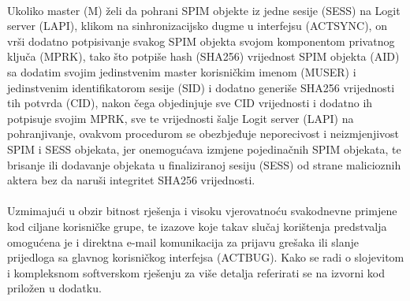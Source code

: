 \paragraph*{}
Ukoliko master (M) želi da pohrani SPIM objekte iz jedne sesije (SESS) na Logit server (LAPI), klikom na sinhronizacijsko dugme u interfejsu (ACTSYNC), on vrši dodatno potpisivanje svakog SPIM objekta svojom komponentom privatnog ključa (MPRK), tako što potpiše hash (SHA256) vrijednost SPIM objekta (AID) sa dodatim svojim jedinstvenim master korisničkim imenom (MUSER) i jedinstvenim identifikatorom sesije (SID) i dodatno generiše SHA256 vrijednosti tih potvrda (CID), nakon čega objedinjuje sve CID vrijednosti i dodatno ih potpisuje svojim MPRK, sve te vrijednosti šalje Logit server (LAPI) na pohranjivanje, ovakvom procedurom se obezbjeđuje neporecivost i neizmjenjivost SPIM i SESS objekata, jer onemogućava izmjene pojedinačnih SPIM objekata, te brisanje ili dodavanje objekata u finaliziranoj sesiju (SESS) od strane malicioznih aktera bez da naruši integritet SHA256 vrijednosti.

\paragraph*{}
Uzmimajući u obzir bitnost rješenja i visoku vjerovatnoću svakodnevne primjene kod ciljane korisničke grupe, te izazove koje takav slučaj korištenja predstvalja omogućena je i direktna e-mail komunikacija za prijavu grešaka ili slanje prijedloga sa glavnog korisničkog interfejsa (ACTBUG). Kako se radi o slojevitom i kompleksnom softverskom rješenju za više detalja referirati se na izvorni kod priložen u dodatku.